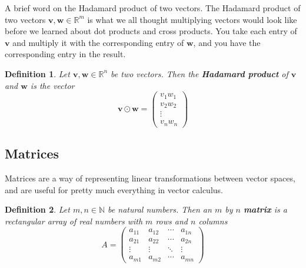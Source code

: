 \documentclass[12pt]{book}
\newcommand{\rbb}{\mathbb{R}}
\theoremstyle{definitionstyle}
\newtheorem{definition}{Definition}[section]
\numberwithin{equation}{section}
\begin{document}
\vspace{0.5cm}

A brief word on the Hadamard product of two vectors. The Hadamard product of two vectors $\mathbf{v}, \mathbf{w} \in \rbb^m$ is what we all thought multiplying vectors would look like before we learned about dot products and cross products. You take each entry of $\mathbf{v}$ and multiply it with the corresponding entry of $\mathbf{w}$, and you have the corresponding entry in the result. 

\begin{definition}\label{hadamard-product}
    Let $\mathbf{v}, \mathbf{w} \in \rbb^n$ be two vectors. Then the \textbf{Hadamard product} of $\mathbf{v}$ and $\mathbf{w}$ is the vector
    \begin{equation}
	\mathbf{v} \odot \mathbf{w} = \begin{pmatrix} v_1 w_1 \\ v_2 w_2 \\ \vdots \\ v_n w_n \end{pmatrix}
    \end{equation}
\end{definition}

\newpage

\subsection{Matrices}

Matrices are a way of representing linear transformations between vector spaces, and are useful for pretty much everything in vector calculus.

\begin{definition}
	Let $m, n \in \mathbb{N}$ be natural numbers. Then an $m$ by $n$ \textbf{matrix} is a rectangular array of real numbers with $m$ rows and $n$ columns
	\begin{equation}
	A = \begin{pmatrix} a_{11} & a_{12} & \cdots & a_{1n} \\ a_{21} & a_{22} & \cdots & a_{2n} \\ \vdots & \vdots & \ddots & \vdots \\ a_{m1} & a_{m2} & \cdots & a_{mn} \end{pmatrix}
	\end{equation}
\end{definition}

\vspace{0.5cm}
\end{document}
